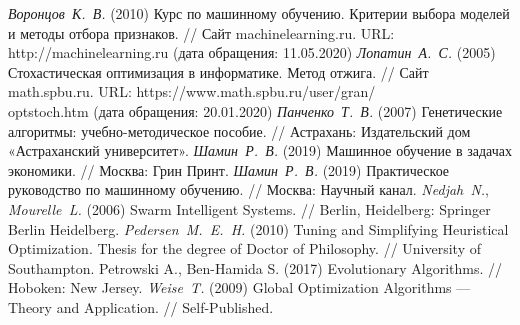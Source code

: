 \clearpage                                  %




\begin{thebibliography}{9}
	 \textit{Воронцов\ К.\ В.} (2010) Курс по машинному обучению. Критерии выбора моделей и методы отбора признаков. // Сайт machinelearning.ru. URL: http://machinelearning.ru (дата обращения: 11.05.2020)
	 \textit{Лопатин\ А.\ С.} (2005) Стохастическая оптимизация
в информатике. Метод отжига. // Сайт math.spbu.ru. URL: https://www.math.spbu.ru/user/gran/\\optstoch.htm (дата обращения: 20.01.2020)
    \textit{Панченко\ Т.\ В.} (2007) Генетические алгоритмы: учебно-методическое пособие. // Астрахань: Издательский дом «Астраханский университет».
	 \textit{Шамин\ Р.\ В.} (2019) Машинное обучение в задачах экономики. // Москва: Грин Принт.
	 \textit{Шамин\ Р.\ В.} (2019) Практическое руководство по машинному обучению. // Москва: Научный канал.
	 \textit{Nedjah\ N.}, \textit{Mourelle\ L.} (2006) Swarm Intelligent Systems. // Berlin, Heidelberg: Springer Berlin Heidelberg.
	 \textit{Pedersen\ M.\ E.\ H.} (2010) Tuning and Simplifying Heuristical Optimization. Thesis for the degree of Doctor of Philosophy. // University of Southampton.
	 Petrowski A., Ben-Hamida S. (2017) Evolutionary Algorithms. // Hoboken: New Jersey.
	 \textit{Weise\ T.} (2009) Global Optimization Algorithms --- Theory and
Application. // Self-Published.

\end{thebibliography}
